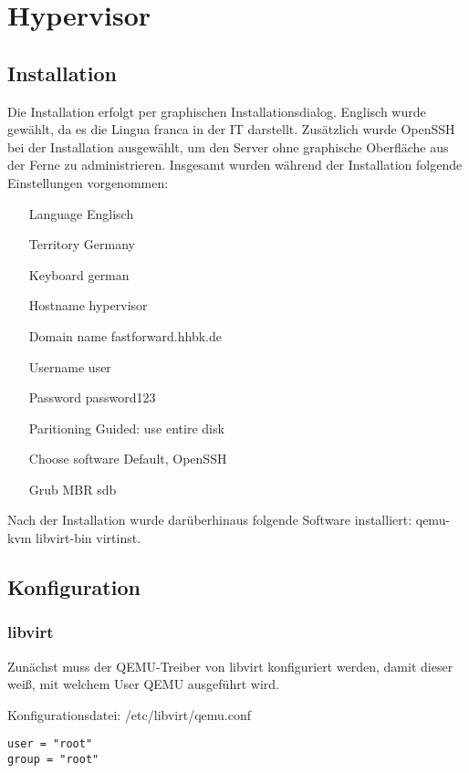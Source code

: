 \section{Hypervisor}

\subsection{Installation}

Die Installation erfolgt per graphischen Installationsdialog. Englisch wurde gewählt, da es die Lingua franca in der IT darstellt. Zusätzlich wurde OpenSSH bei der Installation ausgewählt, um den Server ohne graphische Oberfläche aus der Ferne zu administrieren. Insgesamt wurden während der Installation folgende Einstellungen vorgenommen:
\begin{itemize}
	\item[Language] Englisch
	\item[Territory] Germany
	\item[Keyboard] german
	\item[Hostname] hypervisor
	\item[Domain name] fastforward.hhbk.de
	\item[Username] user
	\item[Password] password123
	\item[Paritioning] Guided: use entire disk
	\item[Choose software] Default, OpenSSH
	\item[Grub MBR] sdb
\end{itemize}

Nach der Installation wurde darüberhinaus folgende Software installiert: {\sc qemu-kvm libvirt-bin virtinst}.

\subsection{Konfiguration}

\subsubsection{libvirt}

Zunächst muss der QEMU-Treiber von {\sc libvirt} konfiguriert werden, damit dieser weiß, mit welchem User QEMU ausgeführt wird. 

Konfigurationsdatei: {\sc /etc/libvirt/qemu.conf}
\begin{lstlisting}
user = "root"
group = "root"
\end{lstlisting}

